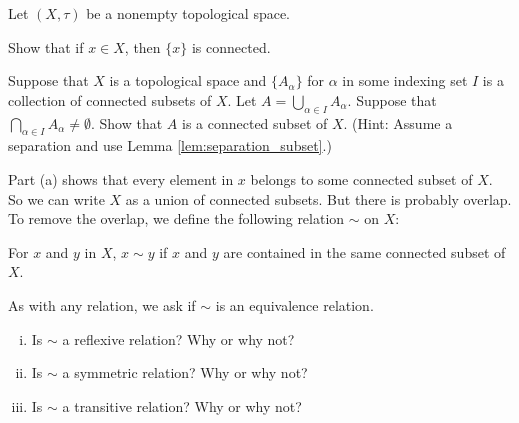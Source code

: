 \begin{activity} \label{act:connected_compenent} Let $(X, \tau)$ be a nonempty topological space. %
\ba
\item Show that if $x \in X$, then $\{x\}$ is connected. 

\item Suppose that $X$ is a topological space and $\{A_{\alpha}\}$ for $\alpha$ in some indexing set $I$ is a collection of connected subsets of $X$. Let $A = \bigcup_{\alpha \in I} A_{\alpha}$. Suppose that $\bigcap_{\alpha \in I} A_{\alpha} \neq \emptyset$. Show that $A$ is a connected subset of $X$. (Hint: Assume a separation and use Lemma \ref{lem:separation_subset}.)

\item Part (a) shows that every element in $x$ belongs to some connected subset of $X$. So we can write $X$ as a union of connected subsets. But there is probably overlap. To remove the overlap, we define the following relation $\sim$ on $X$:
\begin{center} For $x$ and $y$ in $X$,  $x \sim y$ if $x$ and $y$ are contained in the same connected subset of $X$. \end{center}
As with any relation, we ask if $\sim$ is an equivalence relation.
	\begin{enumerate}[i.]
	\item Is $\sim$ a reflexive relation? Why or why not?

	\item Is $\sim$ a symmetric relation? Why or why not?
	
	\item  Is $\sim$ a transitive relation? Why or why not?

	\end{enumerate}
\ea

\end{activity}

